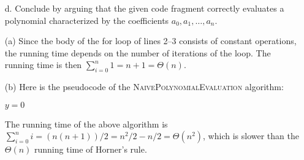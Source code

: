 \documentclass{report}
\makeatletter
\renewenvironment{framed}{%
 \def\FrameCommand##1{\hskip\@totalleftmargin
 \fboxsep=\FrameSep\fbox{##1}}%
 \MakeFramed {\advance\hsize-\width
   \@totalleftmargin\z@ \linewidth\hsize
   \@setminipage}}%
 {\par\unskip\endMakeFramed}
\makeatother
\begin{document}
\begin{enumerate}
{\begin{enumerate}
\item[d.] Conclude by arguing that the given code fragment correctly evaluates
a polynomial characterized by the coefficients $a_0, a_1, \dots, a_n$.
\end{enumerate}
}

\newpage

\begin{framed}
\begin{enumerate}
  \item[(a)] Since the body of the for loop of lines 2{--}3 consists of constant
    operations, the running time depends on the number of iterations of the
    loop. The running time is then $\sum_{i=0}^n 1 = n + 1 = \Theta(n)$.

\item[(b)] Here is the pseudocode of the \textsc{NaivePolynomialEvaluation}
algorithm:\\
\begin{algorithm}[H]
\SetAlgoNoEnd\DontPrintSemicolon%
 \nl $y = 0$\;
 \nl {}
\end{algorithm}

The running time of the above algorithm is
$\sum_{i=0}^n i = (n (n + 1))/2 = n^2/2 - n/2 = \Theta(n^2)$, which is slower
than the $\Theta(n)$ running time of Horner's rule.


\end{enumerate}
\end{framed}
\end{enumerate}
\end{document}
